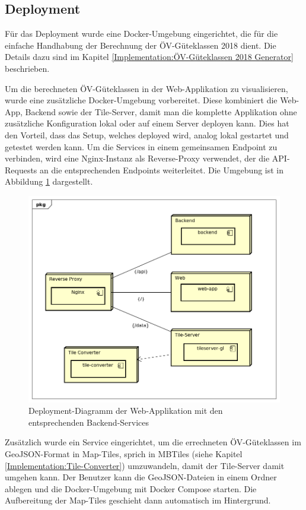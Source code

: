 \subsection{Deployment}
\label{Infrastruktur:Deployment}

Für das Deployment wurde eine Docker-Umgebung eingerichtet, die für die einfache Handhabung der Berechnung der \acs{ÖV}-Güteklassen 2018 dient.
Die Details dazu sind im Kapitel \ref{Implementation:ÖV-Güteklassen 2018 Generator} beschrieben.

Um die berechneten \acs{ÖV}-Güteklassen in der Web-Applikation zu visualisieren, wurde eine zusätzliche Docker-Umgebung vorbereitet.
Diese kombiniert die Web-App, Backend sowie der Tile-Server, damit man die komplette Applikation ohne zusätzliche Konfiguration lokal oder auf einem Server deployen kann.
Dies hat den Vorteil, dass das Setup, welches deployed wird, analog lokal gestartet und getestet werden kann.
Um die Services in einem gemeinsamen Endpoint zu verbinden, wird eine Nginx-Instanz als Reverse-Proxy verwendet, der die \acs{API}-Requests an die entsprechenden Endpoints weiterleitet.
Die Umgebung ist in Abbildung \ref{fig:deployment_web-app} dargestellt.

\begin{figure}[ht]
    \centering
    \includegraphics[width=0.8\linewidth]{projectdoc/img/deployment_web-app}
    \caption[Deployment-Diagramm der Web-Applikation]{Deployment-Diagramm der Web-Applikation mit den entsprechenden Backend-Services}
    \label{fig:deployment_web-app}
\end{figure}

Zusätzlich wurde ein Service eingerichtet, um die errechneten \acs{ÖV}-Güteklassen im GeoJSON-Format in Map-Tiles, sprich in MBTiles (siehe Kapitel \ref{Implementation:Tile-Converter}) umzuwandeln, damit der Tile-Server damit umgehen kann.
Der Benutzer kann die GeoJSON-Dateien in einem Ordner ablegen und die Docker-Umgebung mit Docker Compose starten.
Die Aufbereitung der Map-Tiles geschieht dann automatisch im Hintergrund.